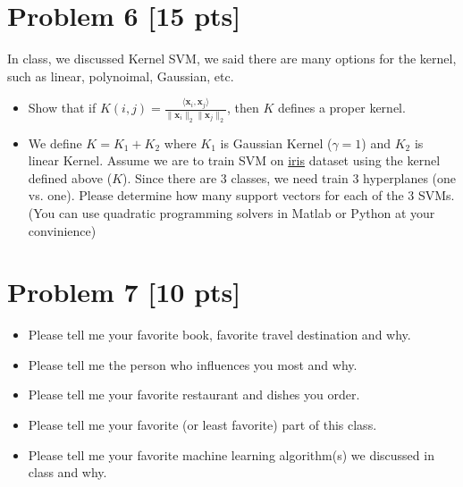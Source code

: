 \documentclass[11pt]{article}
\newcommand{\vct}[1]{\mathbf{#1}}
\def \vx {\vct{x}}
\begin{document}
\section*{Problem 6 [15 pts]}
In class, we discussed Kernel SVM, we said there are many options for the kernel, such as linear, polynoimal, Gaussian, etc.
\begin{itemize}
	\item Show that if $K(i,j)=\frac{\langle \vx_i,\vx_j\rangle}{\|\vx_i\|_2\|\vx_j\|_2}$, then $K$ defines a proper kernel.
	\item We define $K=K_1+K_2$ where $K_1$ is Gaussian Kernel ($\gamma=1$) and $K_2$ is linear Kernel. Assume we are to train SVM on \href{https://en.wikipedia.org/wiki/Iris_flower_data_set}{iris} dataset using the kernel defined above ($K$). Since there are 3 classes, we need train 3 hyperplanes (one vs. one). Please determine how many support vectors for each of the 3 SVMs. (You can use quadratic programming solvers in Matlab or Python at your convinience)
\end{itemize}
\newpage
\section*{Problem 7 [10 pts]}
\begin{itemize}
	\item Please tell me your favorite book, favorite travel destination and why.
	\item Please tell me the person who influences you most and why.
	\item Please tell me your favorite restaurant and dishes you order.
	\item Please tell me your favorite (or least favorite) part of this class.
	\item Please tell me your favorite machine learning algorithm(s) we discussed in class and why.
\end{itemize}
\end{document}
